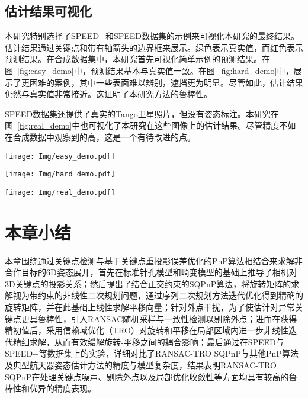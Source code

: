 \subsection{估计结果可视化}

本研究特别选择了SPEED+和SPEED数据集的示例来可视化本研究的最终结果。估计结果通过关键点和带有轴箭头的边界框来展示。绿色表示真实值，而红色表示预测结果。在合成数据集中，本研究首先可视化简单示例的预测结果。在图~\ref{fig:easy_demo}中，预测结果基本与真实值一致。在图~\ref{fig:hard_demo}中，展示了更困难的案例，其中一些表面难以辨别，遮挡更为明显。尽管如此，估计结果仍然与真实值非常接近。这证明了本研究方法的鲁棒性。

SPEED数据集还提供了真实的Tango卫星照片，但没有姿态标注。本研究在图~\ref{fig:real_demo}中也可视化了本研究在这些图像上的估计结果。尽管精度不如在合成数据中观察到的高，这是一个有待改进的点。

\begin{figure*}[!t] \centering \texttt{[image: Img/easy\_demo.pdf]} \caption{SPEED+合成图像估计结果可视化的简单示例} \label{fig:easy_demo} \end{figure*}

\begin{figure*}[!t] \centering \texttt{[image: Img/hard\_demo.pdf]} \caption{SPEED+合成图像估计结果可视化的困难示例} \label{fig:hard_demo} \end{figure*}

\begin{figure*}[htbp] \centering \texttt{[image: Img/real\_demo.pdf]} \caption{在SPEED真实图像上的6D估计结果的实际示例} \label{fig:real_demo} \end{figure*}


\section{本章小结}
\label{sec:RANSAC-TRO-SQPnP:summary}
本章围绕通过关键点检测与基于关键点重投影误差优化的PnP算法相结合来求解非合作目标的6D姿态展开，首先在标准针孔模型和畸变模型的基础上推导了相机对3D关键点的投影关系；然后提出了结合正交约束的SQPnP算法，将旋转矩阵的求解视为带约束的非线性二次规划问题，通过序列二次规划方法迭代优化得到精确的旋转矩阵，并在此基础上线性求解平移向量；针对外点干扰，为了使估计对异常关键点更具鲁棒性，引入RANSAC随机采样与一致性检测以剔除外点；进而在获得精初值后，采用信赖域优化（TRO）对旋转和平移在局部区域内进一步非线性迭代精细求解，从而有效缓解旋转-平移之间的耦合影响；最后通过在SPEED与SPEED+等数据集上的实验，详细对比了RANSAC-TRO SQPnP与其他PnP算法及典型航天器姿态估计方法的精度与模型复杂度，结果表明RANSAC-TRO SQPnP在处理关键点噪声、剔除外点以及局部优化收敛性等方面均具有较高的鲁棒性和优异的精度表现。

